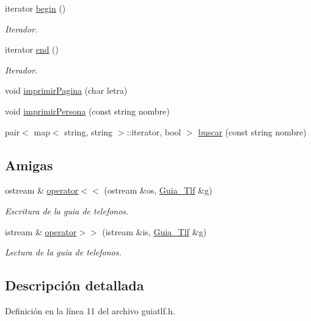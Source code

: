 \begin{DoxyCompactItemize}
iterator \hyperlink{classGuia__Tlf_a0a0f50f45b96349e005d7457a0c05574}{begin} ()
\begin{DoxyCompactList}\small\item\em Iterador. \end{DoxyCompactList}\item 
iterator \hyperlink{classGuia__Tlf_a91777ba1c5e206259943af1eae5aa305}{end} ()
\begin{DoxyCompactList}\small\item\em Iterador. \end{DoxyCompactList}\item 
void \hyperlink{classGuia__Tlf_af6ebc2270d978317b0f6a491ae02e9be}{imprimir\+Pagina} (char letra)
\item 
void \hyperlink{classGuia__Tlf_a58dad69616b264d952fbf1944ea2a5e4}{imprimir\+Persona} (const string nombre)
\item 
pair$<$ map$<$ string, string $>$\+::iterator, bool $>$ \hyperlink{classGuia__Tlf_afe54faba93b8cd891cc150b9d8c9dbd5}{buscar} (const string nombre)
\end{DoxyCompactItemize}
\subsection*{Amigas}
\begin{DoxyCompactItemize}
\item 
ostream \& \hyperlink{classGuia__Tlf_a73eb02557f3118999710c66aa9ecf309}{operator$<$$<$} (ostream \&os, \hyperlink{classGuia__Tlf}{Guia\+\_\+\+Tlf} \&g)
\begin{DoxyCompactList}\small\item\em Escritura de la guia de telefonos. \end{DoxyCompactList}\item 
istream \& \hyperlink{classGuia__Tlf_ac15a5b0c2eb7d5b1843f11beb492495e}{operator$>$$>$} (istream \&is, \hyperlink{classGuia__Tlf}{Guia\+\_\+\+Tlf} \&g)
\begin{DoxyCompactList}\small\item\em Lectura de la guia de telefonos. \end{DoxyCompactList}\end{DoxyCompactItemize}


\subsection{Descripción detallada}


Definición en la línea 11 del archivo guiatlf.\+h.



